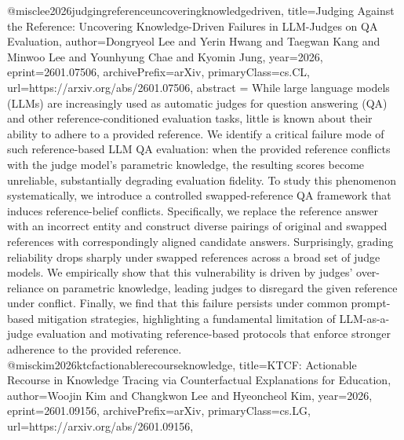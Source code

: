 {}@misc{lee2026judgingreferenceuncoveringknowledgedriven,
      title={Judging Against the Reference: Uncovering Knowledge-Driven Failures in LLM-Judges on QA Evaluation}, 
      author={Dongryeol Lee and Yerin Hwang and Taegwan Kang and Minwoo Lee and Younhyung Chae and Kyomin Jung},
      year={2026},
      eprint={2601.07506},
      archivePrefix={arXiv},
      primaryClass={cs.CL},
      url={https://arxiv.org/abs/2601.07506},
      abstract = {While large language models (LLMs) are increasingly used as automatic judges for question answering (QA) and other reference-conditioned evaluation tasks, little is known about their ability to adhere to a provided reference. We identify a critical failure mode of such reference-based LLM QA evaluation: when the provided reference conflicts with the judge model's parametric knowledge, the resulting scores become unreliable, substantially degrading evaluation fidelity. To study this phenomenon systematically, we introduce a controlled swapped-reference QA framework that induces reference-belief conflicts. Specifically, we replace the reference answer with an incorrect entity and construct diverse pairings of original and swapped references with correspondingly aligned candidate answers. Surprisingly, grading reliability drops sharply under swapped references across a broad set of judge models. We empirically show that this vulnerability is driven by judges' over-reliance on parametric knowledge, leading judges to disregard the given reference under conflict. Finally, we find that this failure persists under common prompt-based mitigation strategies, highlighting a fundamental limitation of LLM-as-a-judge evaluation and motivating reference-based protocols that enforce stronger adherence to the provided reference.}
}@misc{kim2026ktcfactionablerecourseknowledge,
      title={KTCF: Actionable Recourse in Knowledge Tracing via Counterfactual Explanations for Education}, 
      author={Woojin Kim and Changkwon Lee and Hyeoncheol Kim},
      year={2026},
      eprint={2601.09156},
      archivePrefix={arXiv},
      primaryClass={cs.LG},
      url={https://arxiv.org/abs/2601.09156},
}
